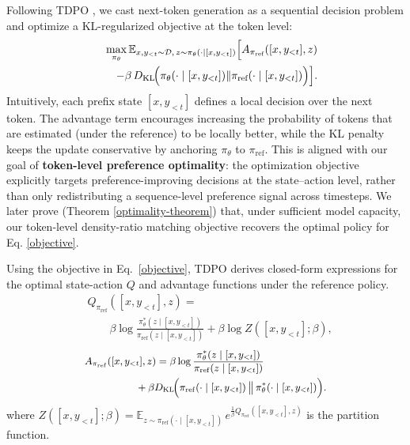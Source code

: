 \documentclass{article}
\theoremstyle{plain}
\theoremstyle{definition}
\theoremstyle{remark}
\begin{document}
Following TDPO \cite{zeng2024tokenleveldirectpreferenceoptimization}, we cast next-token generation as a sequential decision problem and optimize a KL-regularized objective at the token level:
\begin{equation}
\label{objective}
\begin{aligned}
\max_{\pi_{\theta}} \mathbb{E}_{x, y_{<t}\sim\mathcal{D},\, z\sim\pi_{\theta}(\cdot\mid[x,y_{<t}])}
\Bigl[ A_{\pi_{\text{ref}}}([x,y_{<t}],z) \\
\qquad - \beta\,D_{\mathrm{KL}}\!\Bigl(\pi_{\theta}(\cdot\mid[x,y_{<t}])\Vert\pi_{\text{ref}}(\cdot\mid[x,y_{<t}])\Bigr) \Bigr].
\end{aligned}
\end{equation}
Intuitively, each prefix state $[x,y_{<t}]$ defines a local decision over the next token. The advantage term encourages increasing the probability of tokens that are estimated (under the reference) to be locally better, while the KL penalty keeps the update conservative by anchoring $\pi_\theta$ to $\pi_{\mathrm{ref}}$. This is aligned with our goal of \textbf{token-level preference optimality}: the optimization objective explicitly targets preference-improving decisions at the state--action level, rather than only redistributing a sequence-level preference signal across timesteps. We later prove (Theorem \ref{optimality-theorem}) that, under sufficient model capacity, our token-level density-ratio matching objective recovers the optimal policy for Eq. \ref{objective}.

Using the objective in Eq.~\eqref{objective}, TDPO \citep{zeng2024tokenleveldirectpreferenceoptimization}
derives closed-form expressions for the optimal state-action $Q$ and advantage functions under the reference policy. 
\begin{equation}
\begin{split}
& Q_{\pi_{\mathrm{ref}}}([x,y_{<t}], z) = \\
& \qquad \beta \log \frac{\pi_{\theta}^*(z \mid [x,y_{<t}])}{\pi_{\mathrm{ref}}(z \mid [x,y_{<t}])} 
+ \beta \log Z([x,y_{<t}]; \beta),
\end{split}
\label{eq:tokenQformula}
\end{equation}
\begin{equation}
\small
\begin{split}
A_{\pi_{\mathrm{ref}}}([x,y_{<t}], z)
&= \beta \log \frac{\pi_{\theta}^*(z \mid [x,y_{<t}])}{\pi_{\mathrm{ref}}(z \mid [x,y_{<t}])} \\
&\hspace{-2em}
+ \beta D_{\mathrm{KL}}\!\Bigl(
\pi_{\mathrm{ref}}(\cdot\mid [x,y_{<t}])\,\big\|\,\pi_{\theta}^*(\cdot\mid [x,y_{<t}])
\Bigr).
\end{split}
\label{eq:tokenAformula}
\end{equation}
\noindent
where $Z([x,y_{<t}];\beta)
= \mathbb{E}_{z\sim\pi_{\mathrm{ref}}(\cdot\mid[x,y_{<t}])}
\, e^{\tfrac{1}{\beta}Q_{\pi_{\mathrm{ref}}}([x,y_{<t}],z)}$
is the partition function.
\end{document}
